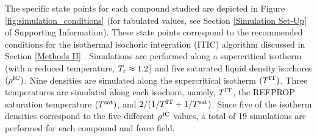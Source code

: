 \documentclass[preprint,letterpaper,floatfix,citeautoscript,aip,jcp]{revtex4-1}
\begin{document}
The specific state points for each compound studied are depicted in Figure \ref{fig:simulation_conditions} (for tabulated values, see Section \ref{Simulation Set-Up} of Supporting Information). 
These state points correspond to the recommended conditions for the isothermal isochoric integration (ITIC) algorithm discussed in Section \ref{Methods II} \cite{Mostafa_Diss,Postdoc_1,Mostafa2018}. 
Simulations are performed along a supercritical isotherm (with a reduced temperature, $T_{\rm r} \approx 1.2$) and five saturated liquid density isochores $(\rho^{\rm IC})$. Nine densities are simulated along the supercritical isotherm $(T^{\rm IT})$. Three temperatures are simulated along each isochore, namely, $T^{\rm IT}$, the REFPROP saturation temperature $(T^{\rm sat})$, and $2/(1/T^{\rm IT} + 1/T^{\rm sat})$. Since five of the isotherm densities correspond to the five different $\rho^{\rm IC}$ values, a total of 19 simulations are performed for each compound and force field.



\end{document}
